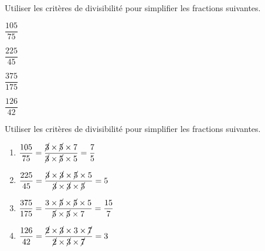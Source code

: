 \begin{exercice*}
    Utiliser les critères de divisibilité pour simplifier les fractions suivantes.
    \begin{enumerate}
            \setlength{\columnseprule}{0pt}
            \begin{multicols}{4}
                \item $\dfrac{105}{75}$
                \item $\dfrac{225}{45}$
                \item $\dfrac{375}{175}$
                \item $\dfrac{126}{42}$
            \end{multicols}
    \end{enumerate}    
    
\end{exercice*}
\begin{corrige}
    Utiliser les critères de divisibilité pour simplifier les fractions suivantes.
    
    \begin{enumerate}
        \item $\dfrac{105}{75}=\dfrac{\cancel{3}\times\cancel{5}\times7}{\cancel{3}\times\cancel{5}\times5}=\dfrac{7}{5}$
        \item $\dfrac{225}{45}=\dfrac{\cancel{3}\times\cancel{3}\times\cancel{5}\times5}{\cancel{3}\times\cancel{3}\times\cancel{5}}=5$
        \item $\dfrac{375}{175}=\dfrac{3\times\cancel{5}\times\cancel{5}\times5}{\cancel{5}\times\cancel{5}\times7}=\dfrac{15}{7}$
        \item $\dfrac{126}{42}=\dfrac{\cancel{2}\times\cancel{3}\times3\times\cancel{7}}{\cancel{2}\times\cancel{3}\times\cancel{7}}=3$
    \end{enumerate}
\end{corrige}


